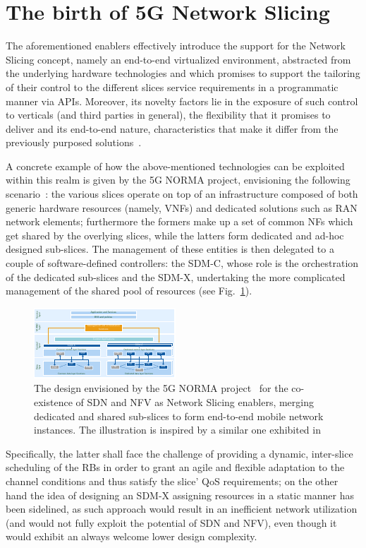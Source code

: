 \documentclass[11pt]{book}
\begin{document}
\section{The birth of 5G Network Slicing}
The aforementioned enablers effectively introduce the support for the Network Slicing concept, namely an end-to-end virtualized environment, abstracted from the underlying hardware technologies and which promises to support the tailoring of their control to the different slices service requirements in a programmatic manner via APIs. Moreover, its novelty factors lie in the exposure of such control to verticals (and third parties in general), the flexibility that it promises to deliver and its end-to-end nature, characteristics that make it differ from the previously purposed solutions~\cite{rost2017network}.


A concrete example of how the above-mentioned technologies can be exploited within this realm is given by the 5G NORMA project, envisioning the following scenario~\cite{normaSpec}: the various slices operate on top of an infrastructure composed of both generic hardware resources (namely, VNFs) and dedicated solutions such as RAN network elements; furthermore the formers make up a set of common NFs which get shared by the overlying slices, while the latters form dedicated and ad-hoc designed sub-slices. The management of these entities is then delegated to a couple of software-defined controllers: the SDM-C, whose role is the orchestration of the dedicated sub-slices and the SDM-X, undertaking the more complicated management of the shared pool of resources (see Fig.~\ref{Fig:SDN}). 
\begin{figure}[h!]
    \centering
    \includegraphics[scale=3.95]{figures/SDN.pdf}
     \setlength\belowcaptionskip{.1cm}
  \caption{The design envisioned by the 5G NORMA project~\cite{normaSpec} for the co-existence of SDN and NFV as Network Slicing enablers, merging dedicated and shared sub-slices to form end-to-end mobile network instances. The illustration is inspired by a similar one exhibited in~\cite{rost2017network}}
    \label{Fig:SDN}
\end{figure}
Specifically, the latter shall face the challenge of providing a dynamic, inter-slice scheduling of the RBs in order to grant an agile and flexible adaptation to the channel conditions and thus satisfy the slice' QoS requirements; on the other hand the idea of designing an SDM-X assigning resources in a static manner has been sidelined, as such approach would result in an inefficient network utilization (and would not fully exploit the potential of SDN and NFV), even though it would exhibit an always welcome lower design complexity.
\end{document}

